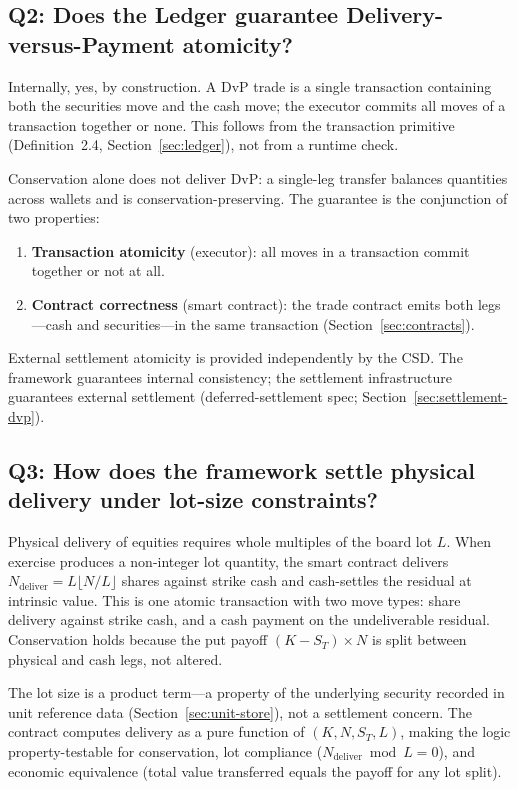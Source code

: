\subsection*{Q2: Does the Ledger guarantee Delivery-versus-Payment atomicity?}

Internally, yes, by construction. A DvP trade is a single transaction containing both the securities move and the cash move; the executor commits all moves of a transaction together or none. This follows from the transaction primitive (Definition~2.4, Section~\ref{sec:ledger}), not from a runtime check.

Conservation alone does not deliver DvP: a single-leg transfer balances quantities across wallets and is conservation-preserving. The guarantee is the conjunction of two properties:

\begin{enumerate}[nosep]
\item \textbf{Transaction atomicity} (executor): all moves in a transaction commit together or not at all.
\item \textbf{Contract correctness} (smart contract): the trade contract emits both legs---cash and securities---in the same transaction (Section~\ref{sec:contracts}).
\end{enumerate}

\noindent External settlement atomicity is provided independently by the CSD. The framework guarantees internal consistency; the settlement infrastructure guarantees external settlement (deferred-settlement spec; Section~\ref{sec:settlement-dvp}).

\subsection*{Q3: How does the framework settle physical delivery under lot-size constraints?}

Physical delivery of equities requires whole multiples of the board lot $L$. When exercise produces a non-integer lot quantity, the smart contract delivers $N_{\text{deliver}} = L\lfloor N/L\rfloor$ shares against strike cash and cash-settles the residual at intrinsic value. This is one atomic transaction with two move types: share delivery against strike cash, and a cash payment on the undeliverable residual. Conservation holds because the put payoff $(K - S_T)\times N$ is split between physical and cash legs, not altered.

The lot size is a product term---a property of the underlying security recorded in unit reference data (Section~\ref{sec:unit-store}), not a settlement concern. The contract computes delivery as a pure function of $(K, N, S_T, L)$, making the logic property-testable for conservation, lot compliance ($N_{\text{deliver}} \bmod L = 0$), and economic equivalence (total value transferred equals the payoff for any lot split).

